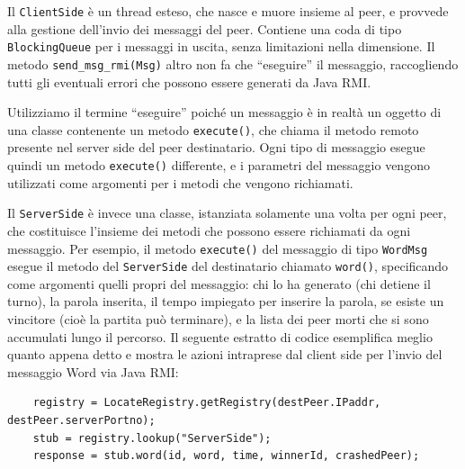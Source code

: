 \documentclass[9pt]{article}
\begin{document}
Il \texttt{ClientSide} è un thread esteso, che nasce e muore insieme al peer, e provvede alla gestione dell'invio dei messaggi del peer. Contiene una coda di tipo \texttt{BlockingQueue} per i messaggi in uscita, senza limitazioni nella dimensione. Il metodo \texttt{send\_msg\_rmi(Msg)} altro non fa che ``eseguire'' il messaggio, raccogliendo tutti gli eventuali errori che possono essere generati da Java RMI. 

Utilizziamo il termine ``eseguire'' poiché un messaggio è in realtà un oggetto di una classe contenente un metodo \texttt{execute()}, che chiama il metodo remoto presente nel server side del peer destinatario. Ogni tipo di messaggio esegue quindi un metodo \texttt{execute()} differente, e i parametri del messaggio vengono utilizzati come argomenti per i metodi che vengono richiamati. 

Il \texttt{ServerSide} è invece una classe, istanziata solamente una volta per ogni peer, che costituisce l'insieme dei metodi che possono essere richiamati da ogni messaggio. Per esempio, il metodo \texttt{execute()} del messaggio di tipo \texttt{WordMsg} esegue il metodo del \texttt{ServerSide} del destinatario chiamato \texttt{word()}, specificando come argomenti quelli propri del messaggio: chi lo ha generato (chi detiene il turno), la parola inserita, il tempo impiegato per inserire la parola, se esiste un vincitore (cioè la partita può terminare), e la lista dei peer morti che si sono accumulati lungo il percorso.
Il seguente estratto di codice esemplifica meglio quanto appena detto e mostra le azioni intraprese dal client side per l'invio del messaggio Word via Java RMI:
\begin{verbatim}
	registry = LocateRegistry.getRegistry(destPeer.IPaddr, destPeer.serverPortno);
	stub = registry.lookup("ServerSide");
	response = stub.word(id, word, time, winnerId, crashedPeer);
\end{verbatim}
\end{document}
